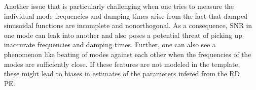 Another issue that is particularly challenging when one tries to measure the individual mode frequencies and damping times arise from the fact that damped sinusoidal functions are incomplete and nonorthogonal. As a consequence, SNR in one mode can leak into another and also poses a potential threat of picking up inaccurate frequencies and damping times. Further, one can also see a phenomenon like beating of modes against each other when the frequencies of the modes are sufficiently close. If these features are not modeled in the template, these might lead to biases in estimates of the parameters infered from the RD PE. 





